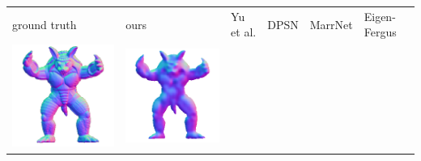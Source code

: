 \begin{center}
\begin{tabularx}{\linewidth}{@{}Y@{}Y@{}Y@{}Y@{}Y@{}Y@{}}
ground truth & ours & Yu et al. & DPSN & MarrNet & Eigen-Fergus \\
\includegraphics[width=\linewidth]{semisynthetic/20160617_22_gt.png} &
\includegraphics[width=\linewidth]{semisynthetic/20160617_22_ours_out.png} &

\end{tabularx}
\end{center}
